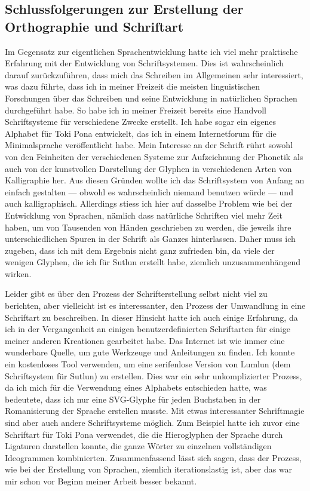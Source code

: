 \documentclass{article}
\begin{document}
\subsection{Schlussfolgerungen zur Erstellung der Orthographie und Schriftart}
Im Gegensatz zur eigentlichen Sprachentwicklung hatte ich viel mehr praktische Erfahrung mit der Entwicklung
von Schriftsystemen. Dies ist wahrscheinlich darauf zurückzuführen, dass mich das Schreiben im Allgemeinen sehr
interessiert, was dazu führte, dass ich in meiner Freizeit die meisten linguistischen Forschungen über
das Schreiben und seine Entwicklung in natürlichen Sprachen durchgeführt habe.
So habe ich in meiner Freizeit bereits eine Handvoll Schriftsysteme für verschiedene Zwecke erstellt.
Ich habe sogar ein eigenes Alphabet für Toki Pona entwickelt, das ich in einem Internetforum für die
Minimalsprache veröffentlicht habe. Mein Interesse an der Schrift rührt sowohl von den Feinheiten der
verschiedenen Systeme zur Aufzeichnung der Phonetik als auch von der kunstvollen Darstellung der Glyphen
in verschiedenen Arten von Kalligraphie her. Aus diesen Gründen wollte ich das Schriftsystem von Anfang
an einfach gestalten --- obwohl es wahrscheinlich niemand benutzen würde --- und auch kalligraphisch.
Allerdings stiess ich hier auf dasselbe Problem wie bei der Entwicklung von Sprachen,
nämlich dass natürliche Schriften viel mehr Zeit haben, um von Tausenden von Händen geschrieben zu werden,
die jeweils ihre unterschiedlichen Spuren in der Schrift als Ganzes hinterlassen. Daher muss ich zugeben,
dass ich mit dem Ergebnis nicht ganz zufrieden bin, da viele der wenigen Glyphen,
die ich für Sutlun erstellt habe, ziemlich unzusammenhängend wirken.

Leider gibt es über den Prozess der Schrifterstellung selbst nicht viel zu berichten,
aber vielleicht ist es interessanter, den Prozess der Umwandlung in eine Schriftart zu beschreiben.
In dieser Hinsicht hatte ich auch einige Erfahrung, da ich in der Vergangenheit an einigen
benutzerdefinierten Schriftarten für einige meiner anderen Kreationen gearbeitet habe.
Das Internet ist wie immer eine wunderbare Quelle, um gute Werkzeuge und Anleitungen zu finden.
Ich konnte ein kostenloses Tool verwenden, um eine serifenlose Version von Lumlun (dem Schriftsystem für Sutlun)
zu erstellen. Dies war ein sehr unkomplizierter Prozess, da ich mich für die Verwendung eines
Alphabets entschieden hatte, was bedeutete, dass ich nur eine SVG-Glyphe für jeden Buchstaben
in der Romanisierung der Sprache erstellen musste. Mit etwas interessanter Schriftmagie sind
aber auch andere Schriftsysteme möglich. Zum Beispiel hatte ich zuvor eine Schriftart für Toki Pona verwendet,
die die Hieroglyphen der Sprache durch Ligaturen darstellen konnte, die ganze Wörter zu einzelnen vollständigen
Ideogrammen kombinierten. Zusammenfassend lässt sich sagen, dass der Prozess, wie bei der Erstellung von Sprachen,
ziemlich iterationslastig ist, aber das war mir schon vor Beginn meiner Arbeit besser bekannt.
\end{document}
